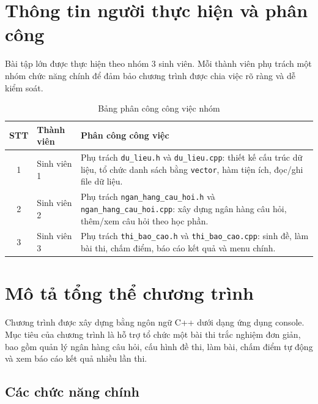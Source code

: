 \documentclass[12pt,a4paper]{article}
\begin{document}
\tableofcontents
\newpage


\section{Thông tin người thực hiện và phân công}

Bài tập lớn được thực hiện theo nhóm 3 sinh viên. Mỗi thành viên phụ trách một nhóm chức năng chính để đảm bảo chương trình được chia việc rõ ràng và dễ kiểm soát.

\begin{table}[H]
\centering
\begin{tabular}{|c|p{5cm}|p{8cm}|}
\hline
\textbf{STT} & \textbf{Thành viên} & \textbf{Phân công công việc} \\
\hline
1 & Sinh viên 1 & Phụ trách \texttt{du\_lieu.h} và \texttt{du\_lieu.cpp}: thiết kế cấu trúc dữ liệu, tổ chức danh sách bằng \texttt{vector}, hàm tiện ích, đọc/ghi file dữ liệu. \\
\hline
2 & Sinh viên 2 & Phụ trách \texttt{ngan\_hang\_cau\_hoi.h} và \texttt{ngan\_hang\_cau\_hoi.cpp}: xây dựng ngân hàng câu hỏi, thêm/xem câu hỏi theo học phần. \\
\hline
3 & Sinh viên 3 & Phụ trách \texttt{thi\_bao\_cao.h} và \texttt{thi\_bao\_cao.cpp}: sinh đề, làm bài thi, chấm điểm, báo cáo kết quả và menu chính. \\
\hline
\end{tabular}
\caption{Bảng phân công công việc nhóm}
\end{table}


\section{Mô tả tổng thể chương trình}

Chương trình được xây dựng bằng ngôn ngữ C++ dưới dạng ứng dụng console. Mục tiêu của chương trình là hỗ trợ tổ chức một bài thi trắc nghiệm đơn giản, bao gồm quản lý ngân hàng câu hỏi, cấu hình đề thi, làm bài, chấm điểm tự động và xem báo cáo kết quả nhiều lần thi.

\subsection{Các chức năng chính}
\end{document}
